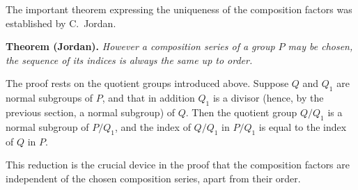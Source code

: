 \documentclass[11pt]{article}
\begin{document}
The important theorem expressing the uniqueness of the composition factors was established by C.~Jordan.

\medskip
\noindent\textbf{Theorem (Jordan).} \emph{However a composition series of a group $P$ may be chosen, the sequence of its indices is always the same up to order.}
\medskip

The proof rests on the quotient groups introduced above. Suppose $Q$ and $Q_1$ are normal subgroups of $P$, and that in addition $Q_1$ is a divisor (hence, by the previous section, a normal subgroup) of $Q$. Then the quotient group $Q/Q_1$ is a normal subgroup of $P/Q_1$, and the index of $Q/Q_1$ in $P/Q_1$ is equal to the index of $Q$ in $P$.

This reduction is the crucial device in the proof that the composition factors are independent of the chosen composition series, apart from their order.
\end{document}
